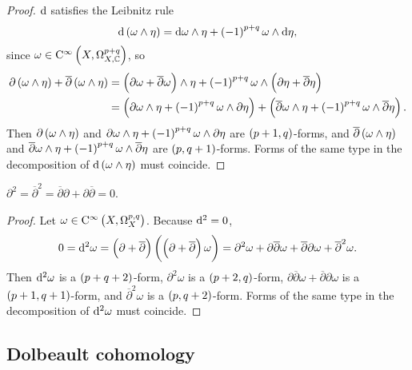 \begin{proof}
$ \mathrm{d} $ satisfies the Leibnitz rule
$$ \d\br{\omega \wedge \eta} = \d\omega \wedge \eta + \br{-1}^{p + q}\omega \wedge \d\eta, $$
since $ \omega \in \C^\infty\br{X, \Omega_{X, \CC}^{p + q}} $, so
\begin{align*}
\partial\br{\omega \wedge \eta} + \overline{\partial}\br{\omega \wedge \eta}
& = \br{\partial\omega + \overline{\partial}\omega} \wedge \eta + \br{-1}^{p + q}\omega \wedge \br{\partial\eta + \overline{\partial}\eta} \\
& = \br{\partial\omega \wedge \eta + \br{-1}^{p + q}\omega \wedge \partial\eta} + \br{\overline{\partial}\omega \wedge \eta + \br{-1}^{p + q}\omega \wedge \overline{\partial}\eta}.
\end{align*}
Then $ \partial\br{\omega \wedge \eta} $ and $ \partial\omega \wedge \eta + \br{-1}^{p + q}\omega \wedge \partial\eta $ are $ \br{p + 1, q} $-forms, and $ \overline{\partial}\br{\omega \wedge \eta} $ and $ \overline{\partial}\omega \wedge \eta + \br{-1}^{p + q}\omega \wedge \overline{\partial}\eta $ are $ \br{p, q + 1} $-forms. Forms of the same type in the decomposition of $ \d\br{\omega \wedge \eta} $ must coincide.
\end{proof}

\begin{lemma}
$ \partial^2 = \overline{\partial}^2 = \overline{\partial}\partial + \partial\overline{\partial} = 0 $.
\end{lemma}

\begin{proof}
Let $ \omega \in \C^\infty\br{X, \Omega_X^{p, q}} $. Because $ \mathrm{d}^2 = 0 $,
$$ 0 = \d^2\omega = \br{\partial + \overline{\partial}}\br{\br{\partial + \overline{\partial}}\omega} = \partial^2\omega + \partial\overline{\partial}\omega + \overline{\partial}\partial\omega + \overline{\partial}^2\omega. $$
Then $ \mathrm{d}^2\omega $ is a $ \br{p + q + 2} $-form, $ \partial^2\omega $ is a $ \br{p + 2, q} $-form, $ \partial\overline{\partial}\omega + \overline{\partial}\partial\omega $ is a $ \br{p + 1, q + 1} $-form, and $ \overline{\partial}^2\omega $ is a $ \br{p, q + 2} $-form. Forms of the same type in the decomposition of $ \mathrm{d}^2\omega $ must coincide.
\end{proof}

\subsection{Dolbeault cohomology}

